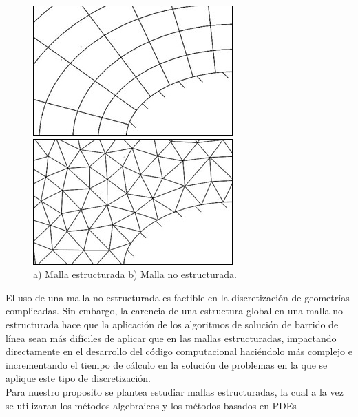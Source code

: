 \documentclass[11pt,letterpaper]{article}
\begin{document}
\begin{figure}[H]
	\begin{minipage}{.49\linewidth}
		\centering
		\includegraphics[scale=0.5]{./imgs/mallaEstructurada.jpg}
	\end{minipage}
	\begin{minipage}{.49\linewidth}
		\centering
		\includegraphics[scale=0.519]{./imgs/mallaNoEstructurada.jpg}
	\end{minipage}
	\caption{a) Malla estructurada b) Malla no estructurada.}
\end{figure}


El uso de una malla no estructurada es factible en la discretización de geometrías complicadas. Sin embargo, la carencia de una estructura global en una malla no estructurada hace que la aplicación de los algoritmos de solución de barrido de línea sean más difíciles de aplicar que en las mallas estructuradas, impactando directamente en el desarrollo del código computacional haciéndolo más complejo e incrementando el tiempo de cálculo en la solución de problemas en la que se aplique este tipo de discretización.\\

Para nuestro proposito se plantea estudiar mallas estructuradas, la cual a la vez se utilizaran los m\'etodos algebraicos y los m\'etodos basados en PDEs
\\
\end{document}
